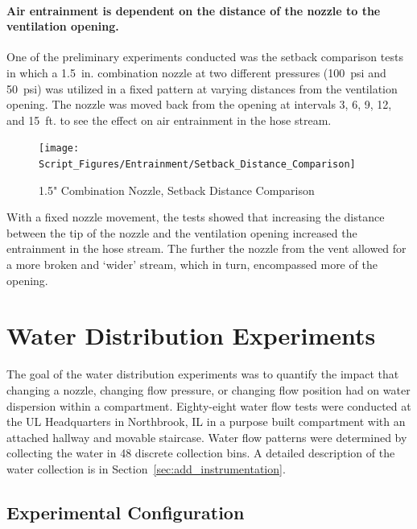 \documentclass{article}
\begin{document}
\clearpage

\paragraph{Air entrainment is dependent on the distance of the nozzle to the ventilation opening.} \mbox{}

One of the preliminary experiments conducted was the setback comparison tests in which a 1.5~in. combination nozzle at two different pressures (100~psi and 50~psi) was utilized in a fixed pattern at varying distances from the ventilation opening. The nozzle was moved back from the opening at intervals 3, 6, 9, 12, and 15~ft. to see the effect on air entrainment in the hose stream.

\begin{figure}[!ht]
	\centering
	\texttt{[image: Script\_Figures/Entrainment/Setback\_Distance\_Comparison]}
	\caption{1.5" Combination Nozzle, Setback Distance Comparison}
	\label{fig:1_5_Combination_Nozzle_Setback_Distance_Comparison}
\end{figure}

With a fixed nozzle movement, the tests showed that increasing the distance between the tip of the nozzle and the ventilation opening increased the entrainment in the hose stream. The further the nozzle from the vent allowed for a more broken and `wider' stream, which in turn, encompassed more of the opening.

\clearpage

\section{Water Distribution Experiments}

The goal of the water distribution experiments was to quantify the impact that changing a nozzle, changing flow pressure, or changing flow position had on water dispersion within a compartment. Eighty-eight water flow tests were conducted at the UL Headquarters in Northbrook, IL in a purpose built compartment with an attached hallway and movable staircase. Water flow patterns were determined by collecting the water in 48 discrete collection bins. A detailed description of the water collection is in Section~\ref{sec:add_instrumentation}.

\subsection{Experimental Configuration}
\end{document}
